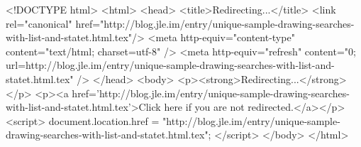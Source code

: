 <!DOCTYPE html>
<html>
<head>
<title>Redirecting...</title>
<link rel="canonical" href="http://blog.jle.im/entry/unique-sample-drawing-searches-with-list-and-statet.html.tex"/>
<meta http-equiv="content-type" content="text/html; charset=utf-8" />
<meta http-equiv="refresh" content="0; url=http://blog.jle.im/entry/unique-sample-drawing-searches-with-list-and-statet.html.tex" />
</head>
<body>
  <p><strong>Redirecting...</strong></p>
  <p><a href='http://blog.jle.im/entry/unique-sample-drawing-searches-with-list-and-statet.html.tex'>Click here if you are not redirected.</a></p>
  <script>
    document.location.href = "http://blog.jle.im/entry/unique-sample-drawing-searches-with-list-and-statet.html.tex";
  </script>
</body>
</html>
